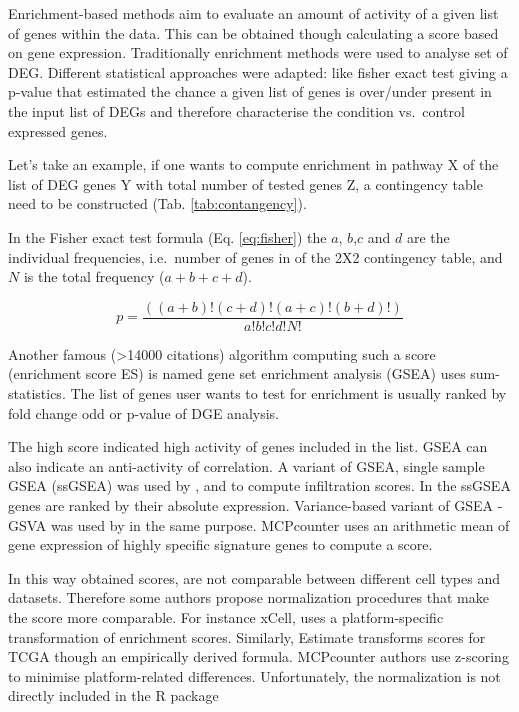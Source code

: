 \documentclass[12pt,]{book}
\theoremstyle{definition}
\theoremstyle{definition}
\theoremstyle{definition}
\theoremstyle{remark}
\begin{document}
Enrichment-based methods aim to evaluate an amount of activity of a
given list of genes within the data. This can be obtained though
calculating a score based on gene expression. Traditionally enrichment
methods were used to analyse set of DEG. Different statistical
approaches were adapted: like fisher exact test giving a p-value that
estimated the chance a given list of genes is over/under present in the
input list of DEGs and therefore characterise the condition vs.~control
expressed genes.

Let's take an example, if one wants to compute enrichment in pathway X
of the list of DEG genes Y with total number of tested genes Z, a
contingency table need to be constructed (Tab. \ref{tab:contangency}).

In the Fisher exact test formula (Eq. \eqref{eq:fisher}) the \(a\),
\(b\),\(c\) and \(d\) are the individual frequencies, i.e.~number of
genes in of the 2X2 contingency table, and \(N\) is the total frequency
(\(a + b + c + d\)).

\begin{equation}
p= \frac{( ( a + b ) ! ( c + d ) ! ( a + c ) ! ( b + d ) ! )}{a ! b ! c ! d ! N ! } \label{eq:fisher}
\end{equation}

Another famous (\textgreater{}14000 citations) algorithm computing such
a score (enrichment score ES) is named gene set enrichment analysis
(GSEA) \citep{Subramanian2005} uses sum-statistics. The list of genes
user wants to test for enrichment is usually ranked by fold change odd
or p-value of DGE analysis.

The high score indicated high activity of genes included in the list.
GSEA can also indicate an anti-activity of correlation. A variant of
GSEA, single sample GSEA (ssGSEA) \citep{Barbie2009} was used by
\citet{Senbabaoglu2016}, \citet{Yoshihara2013} and \citet{Aran2017} to
compute infiltration scores. In the ssGSEA genes are ranked by their
absolute expression. Variance-based variant of GSEA - GSVA
\citep{Hanzelmann2013} was used by \citet{Tamborero2018} in the same
purpose. MCPcounter \citep{Becht2016} uses an arithmetic mean of gene
expression of highly specific signature genes to compute a score.

In this way obtained scores, are not comparable between different cell
types and datasets. Therefore some authors propose normalization
procedures that make the score more comparable. For instance xCell, uses
a platform-specific transformation of enrichment scores. Similarly,
Estimate transforms scores for TCGA though an empirically derived
formula. MCPcounter authors use z-scoring to minimise platform-related
differences. Unfortunately, the normalization is not directly included
in the R package
\end{document}
